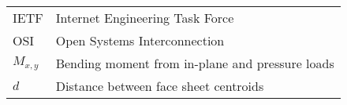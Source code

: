 \chapter*{\abbrevname}
\pagestyle{pagenumber}
%
\begin{acronym}
\end{acronym}
%
\begin{longtable}{lp{5in}}
IETF       & Internet Engineering Task Force\\
OSI        & Open Systems Interconnection\\
$M_{x,y}$ & Bending moment from in-plane and pressure loads\\
$d$        &    Distance between face sheet centroids
\end{longtable}


